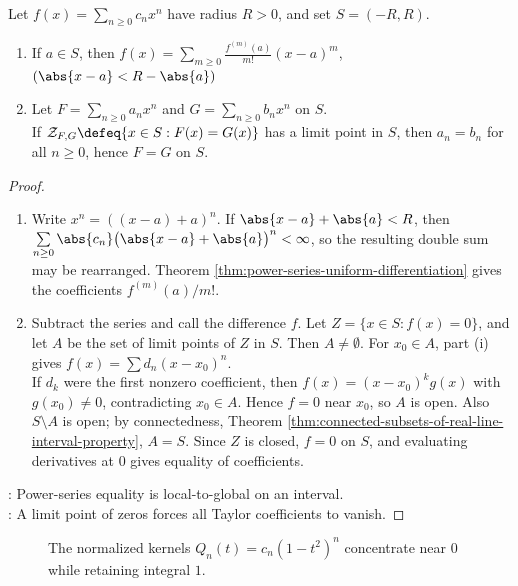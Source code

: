 \begin{theorem} \label{thm:power-series-reexpansion-and-identity} \\
Let $f(x)=\sum_{n\ge0}c_nx^n$ have radius $R>0$, and set $S=(-R,R)$.
\begin{enumerate}[label=(\roman*)]
\setlength{\itemsep}{0pt}
\item If $a\in S$, then $f(x)=\sum\limits_{m\ge0}\frac{f^{(m)}(a)}{m!}(x-a)^m$, $(\abs{x-a}<R-\abs{a})$
\item Let $F=\sum\limits_{n\ge0}a_nx^n$ and $G=\sum\limits_{n\ge0}b_nx^n$ on $S$.\\
If $\mathcal{Z}_{F,G}\defeq\{x\in S:F(x)=G(x)\}$ has a limit point in $S$, then $a_n=b_n$ for all $n\ge0$, hence $F=G$ on $S$.
\end{enumerate}
\begin{proof}
\begin{enumerate}[label=(\roman*)]
\setlength{\itemsep}{0pt}
\item Write $x^n=((x-a)+a)^n$. If $\abs{x-a}+\abs{a}<R$, then $\sum\limits_{n\ge0}\abs{c_n}\bigl(\abs{x-a}+\abs{a}\bigr)^n<\infty$, so the resulting double sum may be rearranged. Theorem \ref{thm:power-series-uniform-differentiation} gives the coefficients $f^{(m)}(a)/m!$.
\item Subtract the series and call the difference $f$. Let $Z=\{x\in S:f(x)=0\}$, and let $A$ be the set of limit points of $Z$ in $S$. Then $A\neq\emptyset$. For $x_0\in A$, part (i) gives $f(x)=\sum d_n(x-x_0)^n$.\\
If $d_k$ were the first nonzero coefficient, then $f(x)=(x-x_0)^kg(x)$ with $g(x_0)\neq0$, contradicting $x_0\in A$. Hence $f=0$ near $x_0$, so $A$ is open. Also $S\setminus A$ is open; by connectedness, Theorem \ref{thm:connected-subsets-of-real-line-interval-property}, $A=S$. Since $Z$ is closed, $f=0$ on $S$, and evaluating derivatives at $0$ gives equality of coefficients.
\end{enumerate}
: Power-series equality is local-to-global on an interval.\\
: A limit point of zeros forces all Taylor coefficients to vanish.
\end{proof}
\end{theorem}

\begin{figure}[H]
  \centering
  
  \caption{The normalized kernels $Q_n(t)=c_n(1-t^2)^n$ concentrate near $0$ while retaining integral $1$.}
  \label{fig:polynomial-bump-kernel}
\end{figure}

